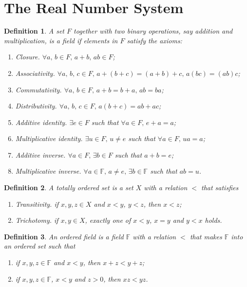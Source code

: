 \documentclass{article}
\theoremstyle{plain}\theoremheaderfont{\normalfont\itshape}\theorembodyfont{\rmfamily}\theoremseparator{.}\newtheorem*{rem}{Remark}\newtheorem*{ex}{Example}\newtheorem*{proof}{Proof}\newtheorem*{altp}{Alternative proof}
\theoremstyle{plain}\theoremheaderfont{\normalfont\bfseries}\theorembodyfont{\rmfamily}\theoremseparator{.}\newtheorem{thm}{Theorem}[section]\newtheorem{lem}[thm]{Lemma}\newtheorem{prop}[thm]{Proposition}\newtheorem*{cor}{Corollary}\newtheorem{defn}[thm]{Definition}\newtheorem{clm}[thm]{Claim}\newtheorem{clminproof}{Claim}
\theoremstyle{break}\theoremheaderfont{\normalfont\itshape}\theorembodyfont{\rmfamily}\theoremseparator{.\medskip}\newtheorem*{proofskip}{Proof}\newtheorem*{exs}{Examples}\newtheorem*{rems}{Remarks}
\theoremstyle{break}\theoremheaderfont{\normalfont\bfseries}\theorembodyfont{\rmfamily}\theoremseparator{.\medskip}\newtheorem{lemskip}[thm]{Lemma}\newtheorem{defnskip}[thm]{Definition}\newtheorem{propskip}[thm]{Proposition}\newtheorem{thmskip}[thm]{Theorem}
\begin{document}
    \section{The Real Number System}
    \begin{defn}
		A set \(F\) together with two binary operations, say addition and multiplication, is a \textit{field} if elements in \(F\) satisfy the axioms:
		\begin{enumerate}[topsep=0pt]
			\item \textit{Closure.} \(\forall a,\, b\in F,\, a+b,\,ab\in F\);
			\item \textit{Associativity.} \(\forall a,\, b,\, c\in F,\, a+(b+c)=(a+b)+c,\,a(bc)=(ab)c\);
			\item \textit{Commutativity.} \(\forall a,\,b\in F,\,a+b=b+a,\,ab=ba\);
			\item \textit{Distributivity.} \(\forall a,\,b,\,c\in F,\, a(b+c)=ab+ac\);
			\item \textit{Additive identity.} \(\exists e\in F\) such that \(\forall a\in F,\,e+a=a\);
			\item \textit{Multiplicative identity.} \(\exists u\in F,\,u\ne e\) such that \(\forall a\in F,\,ua=a\);
			\item \textit{Additive inverse.} \(\forall a\in F,\,\exists b\in F\) such that \(a+b=e\);
			\item \textit{Multiplicative inverse.} \(\forall a\in \mathbb{F},\,a\ne e,\,\exists b\in \mathbb{F}\) such that \(ab=u\).
		\end{enumerate}
	\end{defn}
    \begin{defn}
        A \textit{totally ordered set} is a set \(X\) with a relation \(<\) that satisfies
        \begin{enumerate}[topsep=0pt]
            \item \textit{Transitivity.} if \(x,y,z\in X\) and \(x<y\), \(y<z\), then \(x<z\);
            \item \textit{Trichotomy.} if \(x,y\in X\), exactly one of \(x<y\), \(x=y\) and \(y<x\) holds.
        \end{enumerate}
    \end{defn}
    \begin{defn}
        An \textit{ordered field} is a field \(\mathbb{F}\) with a relation \(<\) that makes \(\mathbb{F}\) into an ordered set such that
        \begin{enumerate}[topsep=0pt]
            \item if \(x,y,z\in\mathbb{F}\) and \(x<y\), then \(x+z<y+z\);
            \item if \(x,y,z\in\mathbb{F}\), \(x<y\) and \(z>0\), then \(xz<yz\).
        \end{enumerate}
    \end{defn}
\end{document}
